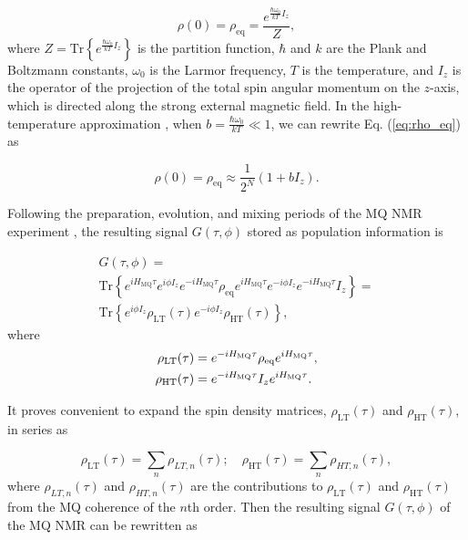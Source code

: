 \begin{equation}
    \label{eq:rho_eq}
    \rho(0) = \rho_{\mathrm{eq}} = 
    \dfrac{e^{\frac{\hbar\omega_{0}}{kT} I_z}}{Z},
\end{equation}
where $Z =\mathrm{Tr}\left\{e^{\frac{\hbar\omega_{0}}{kT} I_z}\right\}$ is the partition function, $\hbar$ and $k$ are the Plank and Boltzmann constants, $\omega_0$ is the Larmor frequency, $T$ is the temperature, and $I_z$ is the operator of the projection of the total spin angular momentum on the $z$-axis, which is directed along the strong external magnetic field. In the high-temperature approximation \cite{Goldman}, when $b = \frac{\hbar\omega_{0}}{kT} \ll 1$, we can rewrite Eq.   (\ref{eq:rho_eq}) as 

\begin{equation}
    \label{eq:rho_ht}
    \rho(0) = \rho_{\mathrm{eq}} \approx
    \dfrac{1}{2^N} (1 + bI_z).
\end{equation}

Following the preparation, evolution, and mixing periods of the MQ NMR experiment \cite{mq_nmr_experiment}, the resulting signal $G(\tau, \phi)$ stored as population information is \cite{lab:low_temp_dyn_1997}

\begin{multline}
    \label{eq:signal}
     G(\tau, \phi) = \\ 
     \mathrm{Tr}\left\{
         e^{iH_\mathrm{MQ}\tau} e^{i\phi I_z} e^{-iH_\mathrm{MQ}\tau}
         \rho_\mathrm{eq}
         e^{iH_\mathrm{MQ}\tau} e^{-i\phi I_z} e^{-iH_\mathrm{MQ}\tau}
         I_z \right\} = \\
    \mathrm{Tr}\left\{e^{i\phi I_z} \rho_\mathrm{LT} (\tau)
              e^{-i\phi I_z} \rho_\mathrm{HT} (\tau) \right\},
\end{multline}
where
\begin{align}
    \label{eq:eval_rho}
    \rho_\mathrm{LT} (\tau) & = e^{-iH_\mathrm{MQ}\tau} \rho_\mathrm{eq} e^{iH_\mathrm{MQ}\tau},
    \notag\\
    \rho_\mathrm{HT} (\tau) & =  e^{-iH_\mathrm{MQ}\tau} I_z e^{iH_\mathrm{MQ}\tau}.
\end{align}

It proves convenient to expand the spin density matrices, $\rho_\mathrm{LT}(\tau)$ and $\rho_\mathrm{HT}(\tau)$, in series as

\begin{equation}
    \label{eq:rho_series}
    \rho_\mathrm{LT} (\tau) = \sum_n \rho_{LT, n}(\tau); \quad
    \rho_\mathrm{HT} (\tau) = \sum_n \rho_{HT, n}(\tau),
\end{equation}
where $\rho_{LT, n} (\tau)$ and $\rho_{HT, n} (\tau)$ are the contributions to $\rho_\mathrm{LT} (\tau)$ and $\rho_\mathrm{HT} (\tau)$ from the MQ coherence of the $n$th order. Then the resulting signal $G(\tau, \phi)$ of the MQ NMR \cite{mq_nmr_experiment} can be rewritten as 

